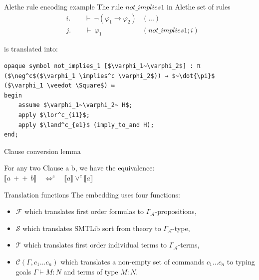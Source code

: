 \documentclass[aspectratio=169,xcolor={dvipsnames}]{beamer}
\begin{document}
\begin{frame}[t,fragile]{Alethe rule encoding example}
    The rule $not\_implies1$ in Alethe set of rules
    \begin{align*}
    & i. \quad \quad \vdash~ \neg (\varphi_1 \rightarrow \varphi_2) &(...)\\
    & j. \quad \quad \vdash~ \varphi_1  &(not\_implies1; i)
    \end{align*}
    
    is translated into:
    
\begin{lstlisting}[mathescape=true]
opaque symbol not_implies_1 [$\varphi_1~\varphi_2$] : π ($\neg^c$($\varphi_1 \implies^c \varphi_2$)) → $~\dot{\pi}$ ($\varphi_1 \veedot \Square$) ≔
begin
    assume $\varphi_1~\varphi_2~ H$;
    apply $\lor^c_{i1}$;
    apply $\land^c_{e1}$ (imply_to_and H);
end;
\end{lstlisting}
\end{frame}

\begin{frame}{Clause conversion lemma}
\begin{lemma}
For any two Clause a b, we have the equivalence:\\
$\llbracket a ~+\!+~ b \rrbracket \quad \iff^c \quad \llbracket a \rrbracket \lor^c \llbracket a \rrbracket $
\end{lemma}
\end{frame}


\begin{frame}{Translation functions}
    The embedding uses four functions:
    \begin{itemize}
        \item $\mathcal{F}$ which translates first order formulas to $\Gamma_\mathcal{A}$-propositions,
        \item $\mathcal{S}$ which translates SMTLib sort from theory to $\Gamma_\mathcal{A}$-type,
        \item $\mathcal{T}$ which translates first order individual terms to $\Gamma_\mathcal{A}$-terms,
        \item $\mathcal{C}(\Gamma, c_1 \dots c_n)$ which translates a non-empty set of commands $c_1 \dots c_n$ to typing goals $\Gamma \vdash M: N$ and terms of type $M: N$.
    \end{itemize}
\end{frame}
\end{document}
